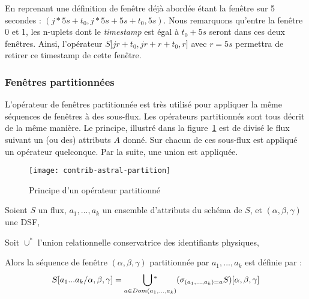 \begin{example}
    En reprenant une définition de fenêtre déjà abordée étant la fenêtre sur 5 secondes : $(j*5s+t_0,j*5s+5s+t_0,5s)$. Nous remarquons qu'entre la fenêtre 0 et 1, les n-uplets dont le \textit{timestamp} est égal à $t_0+5s$ seront dans ces deux fenêtres. Ainsi, l'opérateur $S]jr+t_0,jr+r+t_0,r]$ avec $r=5s$ permettra de retirer ce timestamp de cette fenêtre.
\end{example}


\subsubsection{Fenêtres partitionnées}
L'opérateur de fenêtres partitionnée est très utilisé pour appliquer la même séquences de fenêtres à des sous-flux. Les opérateurs partitionnés sont tous décrit de la même manière. Le principe, illustré dans la figure~\ref{fig:contrib:astral:partition} est de divisé le flux suivant un (ou des) attributs $A$ donné. Sur chacun de ces sous-flux est appliqué un opérateur quelconque. Par la suite, une union est appliquée.
\begin{figure}[ht]
	\centering
	\texttt{[image: contrib-astral-partition]}
	\caption{Principe d'un opérateur partitionné}\label{fig:contrib:astral:partition}
\end{figure}
\begin{defi}\label{def:partition}
	Soient $S$ un flux, $a_1,...,a_k$ un ensemble d'attributs du schéma de $S$, et $(\alpha,\beta,\gamma)$ une DSF,
	
	Soit $\cup^*$ l'union relationnelle conservatrice des identifiants physiques, 

	Alors la séquence de fenêtre $(\alpha,\beta,\gamma)$ partitionnée par $a_1,...,a_k$ est définie par :
	$$S[a_1...a_k/\alpha,\beta,\gamma] = \mathop{\bigcup\null^*}_{a\in Dom(a_1,...,a_k)} (\sigma_{(a_1,...,a_k)=a} S)[\alpha,\beta,\gamma]$$
\end{defi}

